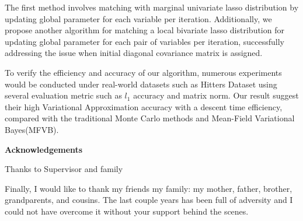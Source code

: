 The first method involves matching with marginal univariate lasso distribution by updating global parameter for each variable per iteration. Additionally, we propose another algorithm for matching a local bivariate lasso distribution for updating global parameter for each pair of variables per iteration, successfully addressing the issue when initial diagonal covariance matrix is assigned.

To verify the efficiency and accuracy of our algorithm, numerous experiments would be conducted under real-world datasets such as Hitters Dataset using several evaluation metric such as $l_1$ accuracy and matrix norm.
Our result suggest their high Variational Approximation accuracy with a descent time efficiency, compared with the traditional Monte Carlo methods and Mean-Field Variational Bayes(MFVB).


\newpage

\begin{center}
    \textbf{\large Acknowledgements}\\
    \vspace{0.5cm}
\end{center}
   Thanks to Supervisor and family 

   Finally, I would like to thank my friends  my family: my mother, father, brother, grandparents, and cousins. The last couple years has been full of adversity and I could not have overcome it without your support behind the scenes.
   
\vfill
\hspace{0pt}
\pagebreak
\newpage